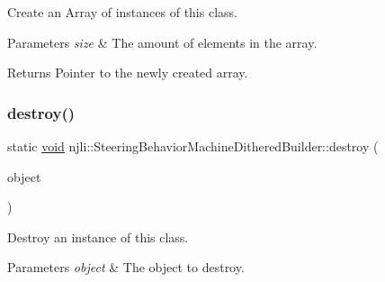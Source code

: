 Create an Array of instances of this class.


\begin{DoxyParams}{Parameters}
{\em size} & The amount of elements in the array.\\
\hline
\end{DoxyParams}
\begin{DoxyReturn}{Returns}
Pointer to the newly created array. 
\end{DoxyReturn}
\mbox{\label{classnjli_1_1_steering_behavior_machine_dithered_builder_a371e2462dc60bbbe246cdf090a0bc793}} 
\subsubsection{\texorpdfstring{destroy()}{destroy()}}
{\footnotesize\ttfamily static \mbox{\hyperlink{_thread_8h_af1e856da2e658414cb2456cb6f7ebc66}{void}} njli\+::\+Steering\+Behavior\+Machine\+Dithered\+Builder\+::destroy (\begin{DoxyParamCaption}\item[{\mbox{\hyperlink{classnjli_1_1_steering_behavior_machine_dithered_builder}{Steering\+Behavior\+Machine\+Dithered\+Builder}} $\ast$}]{object }\end{DoxyParamCaption})\hspace{0.3cm}{\ttfamily [static]}}

Destroy an instance of this class.


\begin{DoxyParams}{Parameters}
{\em object} & The object to destroy. \\
\hline
\end{DoxyParams}
\mbox{\label{classnjli_1_1_steering_behavior_machine_dithered_builder_aba963cab1835b0dc0d8af1fecb0dcfb1}} 
